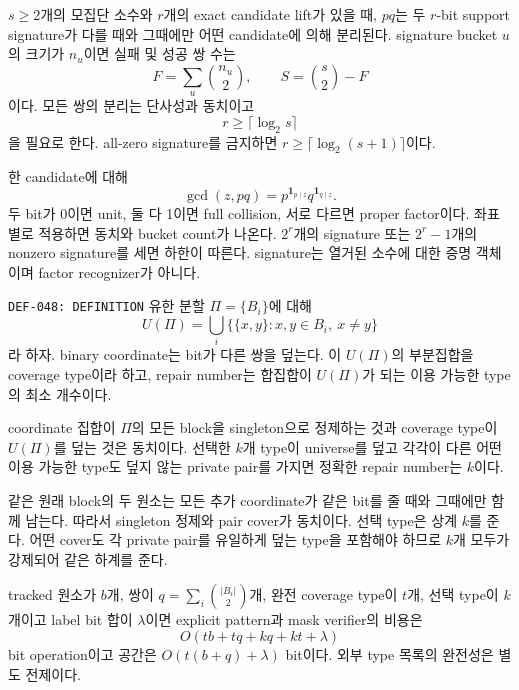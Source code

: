 \documentclass[11pt]{article}
\begin{document}
{}
\(s\ge2\)개의 모집단 소수와 \(r\)개의
exact candidate lift가 있을 때, \(pq\)는 두 \(r\)-bit support
signature가 다를 때와 그때에만 어떤 candidate에 의해 분리된다.
signature bucket \(u\)의 크기가 \(n_u\)이면 실패 및 성공 쌍 수는
\[
F=\sum_u\binom{n_u}{2},\qquad
S=\binom s2-F
\]
이다. 모든 쌍의 분리는 단사성과 동치이고
\[
r\ge\lceil\log_2s\rceil
\]
을 필요로 한다. all-zero signature를 금지하면
\(r\ge\lceil\log_2(s+1)\rceil\)이다.

\begin{claimproof}
한 candidate에 대해
\[
\gcd(z,pq)=p^{\mathbf1_{p\mid z}}q^{\mathbf1_{q\mid z}}.
\]
두 bit가 0이면 unit, 둘 다 1이면 full collision, 서로 다르면 proper
factor이다. 좌표별로 적용하면 동치와 bucket count가 나온다.
\(2^r\)개의 signature 또는 \(2^r-1\)개의 nonzero signature를 세면
하한이 따른다. signature는 열거된 소수에 대한 증명 객체이며 factor
recognizer가 아니다.
\end{claimproof}

{\texttt{DEF-048: DEFINITION}}
유한 분할 \(\Pi=\{B_i\}\)에 대해
\[
 U(\Pi)=\bigcup_i\{\{x,y\}:x,y\in B_i,\ x\ne y\}
\]
라 하자. binary coordinate는 bit가 다른 쌍을 덮는다. 이
\(U(\Pi)\)의 부분집합을 coverage type이라 하고, repair number는
합집합이 \(U(\Pi)\)가 되는 이용 가능한 type의 최소 개수이다.

{}
coordinate 집합이 \(\Pi\)의 모든 block을 singleton으로 정제하는
것과 coverage type이 \(U(\Pi)\)를 덮는 것은 동치이다. 선택한 \(k\)개
type이 universe를 덮고 각각이 다른 어떤 이용 가능한 type도 덮지
않는 private pair를 가지면 정확한 repair number는 \(k\)이다.

\begin{claimproof}
같은 원래 block의 두 원소는 모든 추가 coordinate가 같은 bit를 줄
때와 그때에만 함께 남는다. 따라서 singleton 정제와 pair cover가
동치이다. 선택 type은 상계 \(k\)를 준다. 어떤 cover도 각 private
pair를 유일하게 덮는 type을 포함해야 하므로 \(k\)개 모두가 강제되어
같은 하계를 준다.

tracked 원소가 \(b\)개, 쌍이
\(q=\sum_i\binom{|B_i|}{2}\)개, 완전 coverage type이 \(t\)개, 선택
type이 \(k\)개이고 label bit 합이 \(\lambda\)이면 explicit pattern과
mask verifier의 비용은
\[
 O(tb+tq+kq+kt+\lambda)
\]
bit operation이고 공간은 \(O(t(b+q)+\lambda)\) bit이다. 외부 type
목록의 완전성은 별도 전제이다.
\end{claimproof}
\end{document}
